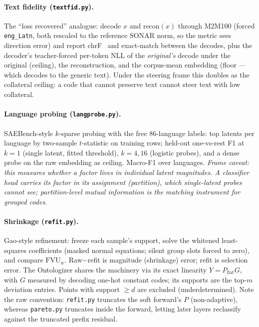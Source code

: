 \documentclass[11pt]{article}
\newcommand{\fvu}{\mathrm{FVU}_w}
\begin{document}
\paragraph{Text fidelity (\texttt{textfid.py}).}
The ``loss recovered'' analogue: decode $x$ and $\mathrm{recon}(x)$
through M2M100 (forced \texttt{eng\_Latn}, both rescaled to the reference
SONAR norm, so the metric sees direction error) and report
chrF~\cite{popovic2015} and
exact-match between the decodes, plus the decoder's teacher-forced
per-token NLL of the \emph{original's} decode under the original
(ceiling), the reconstruction, and the corpus-mean embedding (floor ---
which decodes to the generic text). Under the steering frame this doubles
as the collateral ceiling: a code that cannot preserve text cannot steer
text with low collateral.

\paragraph{Language probing (\texttt{langprobe.py}).}
SAEBench-style $k$-sparse probing with the free 86-language labels: top
latents per language by two-sample $t$-statistic on training rows;
held-out one-vs-rest F1 at $k{=}1$ (single latent, fitted threshold),
$k{=}4,16$ (logistic probes), and a dense probe on the raw embedding as
ceiling. Macro-F1 over languages. \emph{Frame caveat: this measures
whether a factor lives in individual latent magnitudes. A classifier head
carries its factor in its assignment (partition), which single-latent
probes cannot see; partition-level mutual information is the matching
instrument for grouped codes.}

\paragraph{Shrinkage (\texttt{refit.py}).}
Gao-style refinement: freeze each sample's support, solve the whitened
least-squares coefficients (masked normal equations; silent group slots
forced to zero), and compare $\fvu$. Raw$-$refit is magnitude (shrinkage)
error; refit is selection error. The Ontologizer shares the machinery via
its exact linearity $Y = P_{\text{flat}} G$, with $G$ measured by decoding
one-hot constant codes; its supports are the top-$m$ deviation entries.
Points with support $\geq d$ are excluded (underdetermined). Note the raw
convention: \texttt{refit.py} truncates the soft forward's $P$
(non-adaptive), whereas \texttt{pareto.py} truncates inside the forward,
letting later layers reclassify against the truncated prefix residual.
\end{document}
